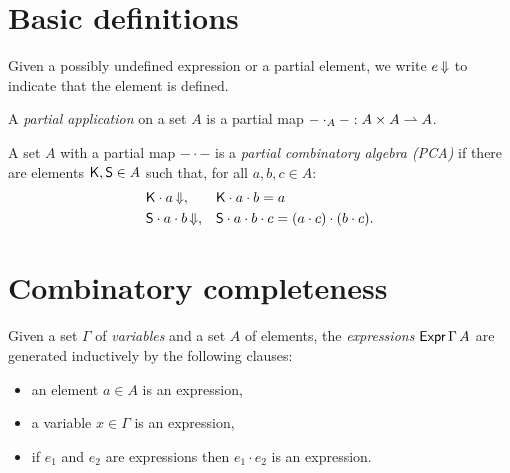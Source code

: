 %

\section{Basic definitions}

Given a possibly undefined expression or a partial element, we write $e\,{\Downarrow}$ to indicate that the element is defined.

\begin{definition}
  \label{def:partial-application}
  \leanok
  A \emph{partial application} on a set $A$ is a partial map ${-} \cdot_A {-} : A \times A \rightharpoonup A$.
\end{definition}

\begin{definition}
  \label{def:PCA}
  A set $A$ with a partial map ${-} \cdot {-}$ is a \emph{partial combinatory algebra (PCA)} if there are
  elements $\mathsf{K}, \mathsf{S} \in A$ such that, for all $a, b, c \in A$:
  \begin{align*}
    &\mathsf{K} \cdot a\,{\Downarrow}, &
    &\mathsf{K} \cdot a \cdot b = a \\
    &\mathsf{S} \cdot a \cdot b\,{\Downarrow}, &
    &\mathsf{S} \cdot a \cdot b \cdot c = (a \cdot c) \cdot (b \cdot c).
  \end{align*}
\end{definition}


\section{Combinatory completeness}


\begin{definition}
  \label{def:expression}
  \leanok
  Given a set $\Gamma$ of \emph{variables} and a set $A$ of elements, the
  \emph{expressions} $\mathsf{Expr}\,\Gamma\,A$ are generated inductively by the following clauses:
  \begin{itemize}
    \item an element $a \in A$ is an expression,
    \item a variable $x \in \Gamma$ is an expression,
    \item if $e_1$ and $e_2$ are expressions then $e_1 \cdot e_2$ is an expression.
  \end{itemize}
\end{definition}

